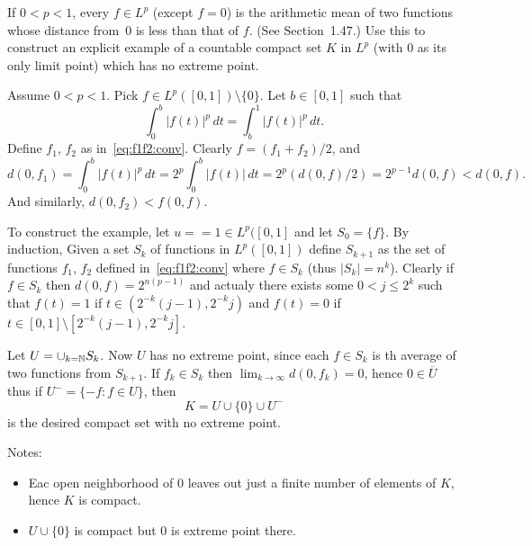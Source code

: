 \begin{enumerate}
\begin{excopy}
If \(0<p<1\), every \(f\in L^p\) (except \(f=0\)) is the arithmetic mean
of two functions whose distance from~$0$ is less than that of $f$.
(See Section~1.47.)
Use this to construct an explicit example of a countable compact set $K$
in \(L^p\) (with $0$ as its only limit point) which has no extreme point.
\end{excopy}

Assume \(0<p<1\).
Pick \(f \in L^p([0,1]) \setminus \{0\}\).
Let \(b\in[0,1]\) such that 
\begin{equation*}
\int_0^b |f(t)|^p\,dt = \int_b^1 |f(t)|^p\,dt.
\end{equation*}
Define \(f_1\), \(f_2\) as in~\eqref{eq:f1f2:conv}.
Clearly \(f = (f_1 + f_2)/2\), and
\begin{equation*}
d(0,f_1) 
= \int_0^b |f(t)|^p\,dt 
= 2^p \int_0^b |f(t)|\,dt 
= 2^p (d(0,f)/2)
= 2^{p-1} d(0,f) < d(0,f).
\end{equation*}
And similarly, \(d(0,f_2) < f(0,f)\).

To construct the example, let \(u == 1 \in L^p([0,1]\)
and let \(S_0 = \{f\}\).
By induction, Given a set \(S_k\) of functions in \(L^p([0,1])\)
define \(S_{k+1}\) as the set of functions \(f_1\), \(f_2\) 
defined in~\eqref{eq:f1f2:conv} where \(f\in S_k\)
(thus \(|S_k| = n^k\)).
Clearly if \(f\in S_k\) then \(d(0,f) = 2^{n(p-1)}\)
and actualy there exists some \(0 < j \leq 2^k\) such that 
\(f(t)=1\) if \(t \in (2^{-k}(j-1), 2^{-k}j)\) and 
\(f(t)=0\) if \(t \in [0,1] \setminus [2^{-k}(j-1), 2^{-k}j]\).

Let \(U = \cup_{k=\mathbb{N}} S_k\). Now $U$ has no extreme point, 
since each \(f\in S_k\) is th average of two functions
from \(S_{k+1}\). If \(f_k\in S_k\) then \(\lim_{k\to\infty} d(0,f_k) = 0\), 
hence \(0 \in \overline{U}\) thus if 
\(U^- = \{-f: f\in U\}\), then
\begin{equation*}
K = U \cup \{0\} \cup U^-
\end{equation*}
is the desired compact set with no extreme point.

Notes:
\begin{itemize}
\item
 Eac open neighborhood of $0$ leaves out just a finite 
 number of elements of $K$, hence $K$ is compact.
\item
 \(U \cup \{0\}\) is compact but $0$ is extreme point there.
\end{itemize}



\end{enumerate}

